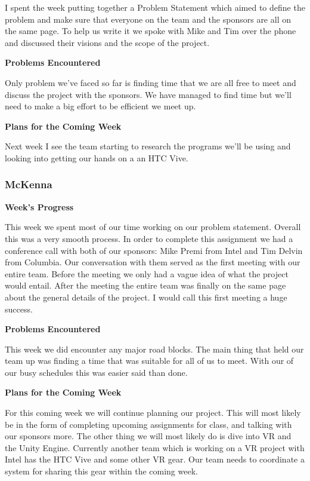 \documentclass[10pt,journal,compsoc,onecolumn, draftclsnofoot]{IEEEtran}
\begin{document}
I spent the week putting together a Problem Statement which aimed to define the problem and make sure that everyone on the team and the sponsors are all on the same page. To help us write it we spoke with Mike and Tim over the phone and discussed their visions and the scope of the project.

\noindent \textbf{Problems Encountered}

Only problem we've faced so far is finding time that we are all free to meet and discuss the project with the sponsors. We have managed to find time but we'll need to make a big effort to be efficient we meet up.

\noindent \textbf{Plans for the Coming Week}

Next week I see the team starting to research the programs we'll be using and looking into getting our hands on a an HTC Vive.

\subsubsection{McKenna}
\noindent \textbf{Week's Progress}

This week we spent most of our time working on our problem statement. Overall this was a very smooth process. In order to complete this assignment we had a conference call with both of our sponsors: Mike Premi from Intel and Tim Delvin from Columbia. Our conversation with them served as the first meeting with our entire team. Before the meeting we only had a vague idea of what the project would entail. After the meeting the entire team was finally on the same page about the general details of the project. I would call this first meeting a huge success.

\noindent \textbf{Problems Encountered}

This week we did encounter any major road blocks. The main thing that held our team up was finding a time that was suitable for all of us to meet. With our of our busy schedules this was easier said than done.

\noindent \textbf{Plans for the Coming Week}

For this coming week we will continue planning our project. This will most likely be in the form of completing upcoming assignments for class, and talking with our sponsors more. The other thing we will most likely do is dive into VR and the Unity Engine. Currently another team which is working on a VR project with Intel has the HTC Vive and some other VR gear. Our team needs to coordinate a system for sharing this gear within the coming week.
\end{document}
